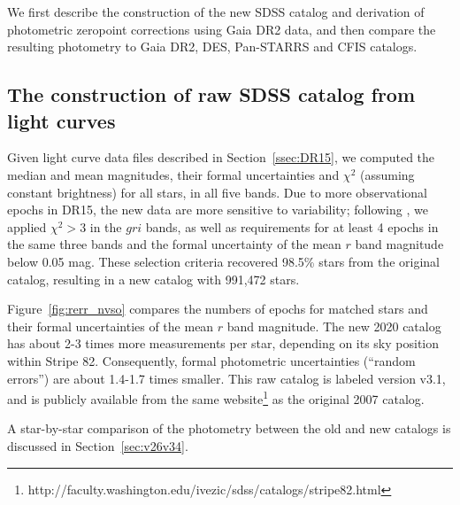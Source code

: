 


We first describe the construction of the new SDSS catalog and derivation of photometric
zeropoint corrections using Gaia DR2 data, and then compare the resulting photometry to 
Gaia DR2, DES, Pan-STARRS and CFIS catalogs. 


\subsection{The construction of raw SDSS catalog from light curves \label{sec:averaging}} 

Given light curve data files described in Section~\ref{ssec:DR15}, we computed the median 
and mean magnitudes, their formal uncertainties and $\chi^2$ (assuming constant brightness)
for all stars, in all five bands. Due to more observational epochs in DR15, the new data are more 
sensitive to variability; following \pO, we applied $\chi^2>3$ in the $gri$ bands, as well as  
requirements for at least 4 epochs in the same three bands and the formal uncertainty of the 
mean $r$ band magnitude below 0.05 mag. These selection criteria recovered 98.5\% stars from
the original catalog, resulting in a new catalog with 991,472 stars. 

Figure~\ref{fig:rerr_nvso} compares the numbers of epochs for matched stars and their formal
uncertainties of the mean $r$ band magnitude. The new 2020 catalog has about 2-3 times more 
measurements per star, depending on its sky position within Stripe 82. Consequently,  formal 
photometric uncertainties (``random errors'') are about 1.4-1.7 times smaller. This raw catalog
is labeled version v3.1, and is publicly available from the same
website\footnote{http://faculty.washington.edu/ivezic/sdss/catalogs/stripe82.html} 
as the original 2007 catalog. 

A star-by-star comparison of the photometry between the old and new catalogs is discussed
in Section~\ref{sec:v26v34}. 

